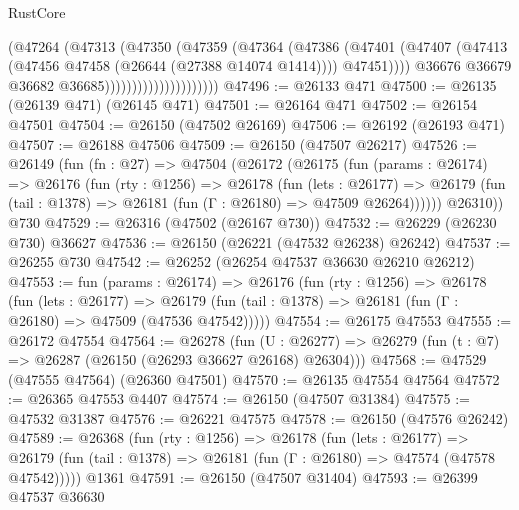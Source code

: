 \begin{lexlean}{RustCore}
\begin{coremodule}
                                      (@47264
                                        (@47313
                                          (@47350
                                            (@47359
                                              (@47364
                                                (@47386
                                                  (@47401
                                                    (@47407
                                                      (@47413
                                                        (@47456
                                                          @47458
                                                          (@26644 (@27388 @14074 @1414))))
                                                      @47451))))
                                              @36676
                                              @36679
                                              @36682
                                              @36685)))))))))))))))))))))
@47496 := @26133 @471
@47500 := @26135 (@26139 @471) (@26145 @471)
@47501 := @26164 @471
@47502 := @26154 @47501
@47504 := @26150 (@47502 @26169)
@47506 := @26192 (@26193 @471)
@47507 := @26188 @47506
@47509 := @26150 (@47507 @26217)
@47526 := @26149
    (fun (fn : @27) =>
    @47504
      (@26172
        (@26175
          (fun (params : @26174) =>
          @26176
            (fun (rty : @1256) =>
            @26178
              (fun (lets : @26177) =>
              @26179 (fun (tail : @1378) => @26181 (fun (Γ : @26180) => @47509 @26264))))))
        @26310))
    @730
@47529 := @26316 (@47502 (@26167 @730))
@47532 := @26229 (@26230 @730) @36627
@47536 := @26150 (@26221 (@47532 @26238) @26242)
@47537 := @26255 @730
@47542 := @26252 (@26254 @47537 @36630 @26210 @26212)
@47553 := fun (params : @26174) =>
  @26176
    (fun (rty : @1256) =>
    @26178
      (fun (lets : @26177) =>
      @26179 (fun (tail : @1378) => @26181 (fun (Γ : @26180) => @47509 (@47536 @47542)))))
@47554 := @26175 @47553
@47555 := @26172 @47554
@47564 := @26278
    (fun (U : @26277) => @26279 (fun (t : @7) => @26287 (@26150 (@26293 @36627 @26168) @26304)))
@47568 := @47529 (@47555 @47564) (@26360 @47501)
@47570 := @26135 @47554 @47564
@47572 := @26365 @47553 @4407
@47574 := @26150 (@47507 @31384)
@47575 := @47532 @31387
@47576 := @26221 @47575
@47578 := @26150 (@47576 @26242)
@47589 := @26368
    (fun (rty : @1256) =>
    @26178
      (fun (lets : @26177) =>
      @26179 (fun (tail : @1378) => @26181 (fun (Γ : @26180) => @47574 (@47578 @47542)))))
    @1361
@47591 := @26150 (@47507 @31404)
@47593 := @26399 @47537 @36630

\end{coremodule}
\end{lexlean}
